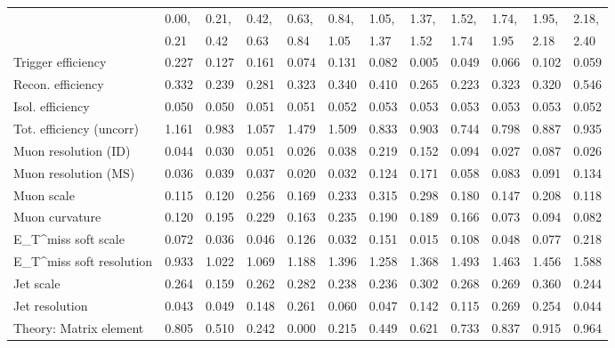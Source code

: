 \begin{tabular}{l|p{0.6cm}p{0.6cm}p{0.6cm}p{0.6cm}p{0.6cm}p{0.6cm}p{0.6cm}p{0.6cm}p{0.6cm}p{0.6cm}p{0.6cm}}
\hline
   & 0.00, & 0.21, & 0.42, & 0.63, & 0.84, & 1.05, & 1.37, & 1.52, & 1.74, & 1.95, & 2.18,  \\ 
   & 0.21 & 0.42 & 0.63 & 0.84 & 1.05 & 1.37 & 1.52 & 1.74 & 1.95 & 2.18 & 2.40  \\ 
\hline
Trigger efficiency                       & 0.227 & 0.127 & 0.161 & 0.074 & 0.131 & 0.082 & 0.005 & 0.049 & 0.066 & 0.102 & 0.059 \\
Recon. efficiency                        & 0.332 & 0.239 & 0.281 & 0.323 & 0.340 & 0.410 & 0.265 & 0.223 & 0.323 & 0.320 & 0.546 \\
Isol. efficiency                         & 0.050 & 0.050 & 0.051 & 0.051 & 0.052 & 0.053 & 0.053 & 0.053 & 0.053 & 0.053 & 0.052 \\
Tot. efficiency (uncorr)                 & 1.161 & 0.983 & 1.057 & 1.479 & 1.509 & 0.833 & 0.903 & 0.744 & 0.798 & 0.887 & 0.935 \\
Muon resolution (ID)                     & 0.044 & 0.030 & 0.051 & 0.026 & 0.038 & 0.219 & 0.152 & 0.094 & 0.027 & 0.087 & 0.026 \\
Muon resolution (MS)                     & 0.036 & 0.039 & 0.037 & 0.020 & 0.032 & 0.124 & 0.171 & 0.058 & 0.083 & 0.091 & 0.134 \\
Muon scale                               & 0.115 & 0.120 & 0.256 & 0.169 & 0.233 & 0.315 & 0.298 & 0.180 & 0.147 & 0.208 & 0.118 \\
Muon curvature                           & 0.120 & 0.195 & 0.229 & 0.163 & 0.235 & 0.190 & 0.189 & 0.166 & 0.073 & 0.094 & 0.082 \\
E_{T}^{miss} soft scale                  & 0.072 & 0.036 & 0.046 & 0.126 & 0.032 & 0.151 & 0.015 & 0.108 & 0.048 & 0.077 & 0.218 \\
E_{T}^{miss} soft resolution             & 0.933 & 1.022 & 1.069 & 1.188 & 1.396 & 1.258 & 1.368 & 1.493 & 1.463 & 1.456 & 1.588 \\
Jet scale                                & 0.264 & 0.159 & 0.262 & 0.282 & 0.238 & 0.236 & 0.302 & 0.268 & 0.269 & 0.360 & 0.244 \\
Jet resolution                           & 0.043 & 0.049 & 0.148 & 0.261 & 0.060 & 0.047 & 0.142 & 0.115 & 0.269 & 0.254 & 0.044 \\
Theory: Matrix element                   & 0.805 & 0.510 & 0.242 & 0.000 & 0.215 & 0.449 & 0.621 & 0.733 & 0.837 & 0.915 & 0.964 \\

\end{tabular}
